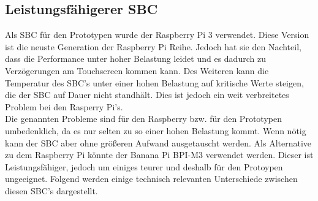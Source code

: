 \subsection{Leistungsfähigerer \gls{SBC}}
Als \gls{SBC} für den Prototypen wurde der Raspberry Pi 3 verwendet. Diese Version ist die neuste Generation der Raspberry Pi Reihe. Jedoch hat sie den Nachteil, dass die Performance unter hoher Belastung leidet und es dadurch zu Verzögerungen am Touchscreen kommen kann. Des Weiteren kann die Temperatur des SBC's unter einer hohen Belastung auf kritische Werte steigen, die der \gls{SBC} auf Dauer nicht standhält. Dies ist jedoch ein weit verbreitetes Problem bei den Rasperry Pi's.\\Die genannten Probleme sind für den Raspberry bzw. für den Prototypen umbedenklich, da es nur selten zu so einer hohen Belastung kommt. Wenn nötig kann der \gls{SBC} aber ohne größeren Aufwand ausgetauscht werden. Als Alternative zu dem Raspberry Pi könnte der Banana Pi BPI-M3 verwendet werden. Dieser ist Leistungsfähiger, jedoch um einiges teurer und deshalb für den Protoypen ungeeignet. Folgend werden einige technisch relevanten Unterschiede zwischen diesen \gls{SBC}'s dargestellt.


